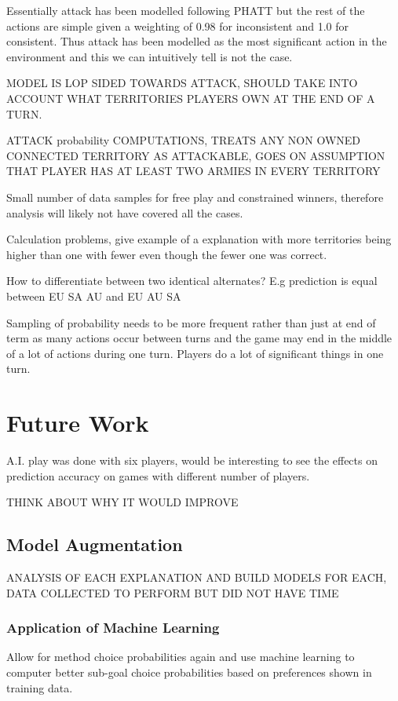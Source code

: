 \documentclass[parskip]{cs4rep}
\begin{document}
Essentially attack has been modelled following PHATT but the rest of the actions are simple given a weighting of 0.98 for inconsistent and 1.0 for consistent. Thus attack has been modelled as the most significant action in the environment and this we can intuitively tell is not the case.

MODEL IS LOP SIDED TOWARDS ATTACK, SHOULD TAKE INTO ACCOUNT WHAT TERRITORIES PLAYERS OWN AT THE END OF A TURN.

ATTACK probability COMPUTATIONS, TREATS ANY NON OWNED CONNECTED TERRITORY AS ATTACKABLE, GOES ON ASSUMPTION THAT PLAYER HAS AT LEAST TWO ARMIES IN EVERY TERRITORY

Small number of data samples for free play and constrained winners, therefore analysis will likely not have covered all the cases.

Calculation problems, give example of a explanation with more territories being higher than one with fewer even though the fewer one was correct.

How to differentiate between two identical alternates? E.g prediction is equal between EU SA AU and EU AU SA 

Sampling of probability needs to be more frequent rather than just at end of term as many actions occur between turns and the game may end in the middle of a lot of actions during one turn. Players do a lot of significant things in one turn.

\section{Future Work}

A.I. play was done with six players, would be interesting to see the effects on prediction accuracy on games with different number of players.

THINK ABOUT WHY IT WOULD IMPROVE

\subsection{Model Augmentation}

ANALYSIS OF EACH EXPLANATION AND BUILD MODELS FOR EACH, DATA COLLECTED TO PERFORM BUT DID NOT HAVE TIME

\subsubsection{Application of Machine Learning}

Allow for method choice probabilities again and use machine learning to computer better sub-goal choice probabilities based on preferences shown in training data.
\end{document}
